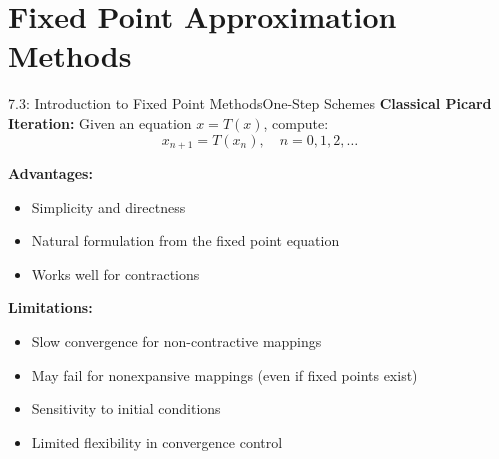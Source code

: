 \documentclass[aspectratio=169,10pt]{beamer}
\begin{document}
\section{Fixed Point Approximation Methods}

\begin{frame}{7.3: Introduction to Fixed Point Methods}{One-Step Schemes}
\textbf{Classical Picard Iteration:} Given an equation $x = T(x)$, compute:
\[
x_{n+1} = T(x_n), \quad n = 0, 1, 2, \ldots
\]

\vspace{0.3cm}

\textbf{Advantages:}
\begin{itemize}
    \item Simplicity and directness
    \item Natural formulation from the fixed point equation
    \item Works well for contractions
\end{itemize}

\vspace{0.3cm}

\textbf{Limitations:}
\begin{itemize}
    \item Slow convergence for non-contractive mappings
    \item May fail for nonexpansive mappings (even if fixed points exist)
    \item Sensitivity to initial conditions
    \item Limited flexibility in convergence control
\end{itemize}
\end{frame}
\end{document}

